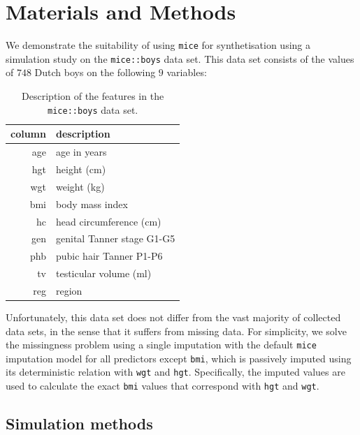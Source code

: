\documentclass[psych,article,submit,moreauthors,pdftex]{mdpi}
\begin{document}
\hypertarget{materials-and-methods}{%
\section{Materials and Methods}\label{materials-and-methods}}

We demonstrate the suitability of using \texttt{mice} for synthetisation
using a simulation study on the \texttt{mice::boys} data set. This data
set consists of the values of \(748\) Dutch boys on the following \(9\)
variables:

\begin{table}[H]
\caption{Description of the features in the \texttt{mice::boys} data set.}
\centering
\begin{tabular}{rl}
\hline
column & description                \\ 
\hline
age    & age in years               \\ 
hgt    & height (cm)                \\ 
wgt    & weight (kg)                \\ 
bmi    & body mass index            \\ 
hc     & head circumference (cm)    \\ 
gen    & genital Tanner stage G1-G5 \\ 
phb    & pubic hair Tanner P1-P6    \\ 
tv     & testicular volume (ml)     \\ 
reg    & region                     \\ 
\hline
\end{tabular}
\end{table}

Unfortunately, this data set does not differ from the vast majority of
collected data sets, in the sense that it suffers from missing data. For
simplicity, we solve the missingness problem using a single imputation
with the default \texttt{mice} imputation model for all predictors
except \texttt{bmi}, which is passively imputed using its deterministic
relation with \texttt{wgt} and \texttt{hgt}. Specifically, the imputed
values are used to calculate the exact \texttt{bmi} values that
correspond with \texttt{hgt} and \texttt{wgt}.

\hypertarget{simulation-methods}{%
\subsection{Simulation methods}\label{simulation-methods}}
\end{document}
